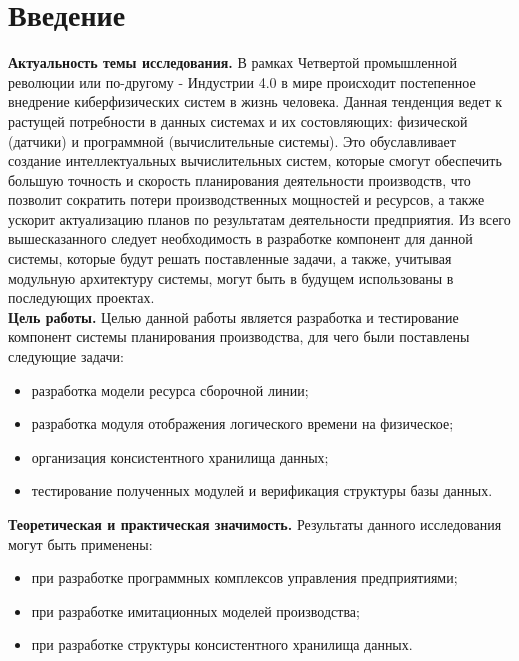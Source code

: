 \section*{Введение}
\indent \textbf{Актуальность темы исследования.}
В рамках Четвертой промышленной революции или по-другому - Индустрии 4.0 в мире происходит постепенное внедрение киберфизических систем в жизнь человека.
Данная тенденция ведет к растущей потребности в данных системах и их состовляющих: физической (датчики) и программной (вычислительные системы).
Это обуславливает создание интеллектуальных вычислительных систем, которые смогут обеспечить большую точность и скорость планирования деятельности производств, что позволит сократить потери производственных мощностей и ресурсов, а также ускорит актуализацию планов по результатам деятельности предприятия.
Из всего вышесказанного следует необходимость в разработке компонент для данной системы, которые будут решать поставленные задачи, а также, учитывая модульную архитектуру системы, могут быть в будущем использованы в последующих проектах.\\
\indent \textbf{Цель работы.} 
Целью данной работы является разработка и тестирование компонент системы планирования производства, для чего были поставлены следующие задачи:
\begin{itemize}
	\item разработка модели ресурса сборочной линии;
	\item разработка модуля отображения логического времени на физическое;
	\item организация консистентного хранилища данных;
	\item тестирование полученных модулей и верификация структуры базы данных.
\end{itemize}

\indent \textbf{Теоретическая и практическая значимость.}
Результаты данного исследования могут быть применены:
\begin{itemize}
	\item при разработке программных комплексов управления предприятиями;
	\item при разработке имитационных моделей производства;
	\item при разработке структуры консистентного хранилища данных.
\end{itemize}

